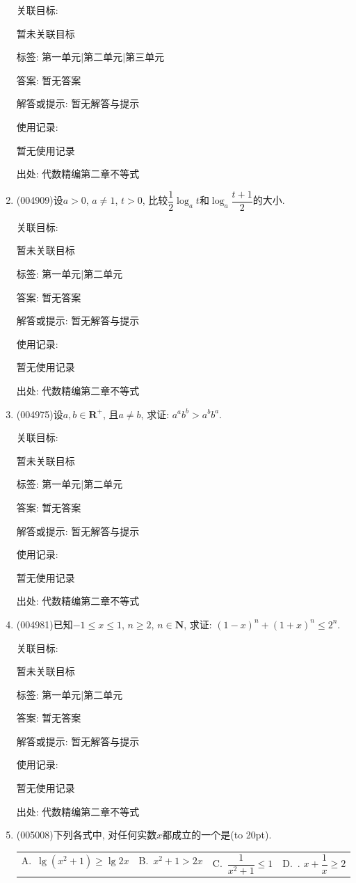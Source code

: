 \documentclass[10pt,a4paper]{article}
\newcommand{\bracket}[1]{(\hbox to #1pt{})}
\newcommand{\fourch}[4]{\par\begin{tabular}{p{.23\textwidth}p{.23\textwidth}p{.23\textwidth}p{.23\textwidth}}
A.~#1 &B.~#2& C.~#3& D.~#4
\end{tabular}}
\begin{document}
\begin{enumerate}[1.]
关联目标:

暂未关联目标



标签: 第一单元|第二单元|第三单元

答案: 暂无答案

解答或提示: 暂无解答与提示

使用记录:

暂无使用记录


出处: 代数精编第二章不等式
\item { (004909)}设$a>0$, $a\ne 1$, $t>0$, 比较$\dfrac 12\log_at$和$\log_a\dfrac{t+1}2$的大小.


关联目标:

暂未关联目标



标签: 第一单元|第二单元

答案: 暂无答案

解答或提示: 暂无解答与提示

使用记录:

暂无使用记录


出处: 代数精编第二章不等式
\item { (004975)}设$a,b\in \mathbf{R}^+$, 且$a\ne b$, 求证: $a^ab^b>a^bb^a$.


关联目标:

暂未关联目标



标签: 第一单元|第二单元

答案: 暂无答案

解答或提示: 暂无解答与提示

使用记录:

暂无使用记录


出处: 代数精编第二章不等式
\item { (004981)}已知$-1\le x\le 1$, $n\ge 2$, $n\in \mathbf{N}$, 求证: $(1-x)^n+(1+x)^n\le 2^n$.


关联目标:

暂未关联目标



标签: 第一单元|第二单元

答案: 暂无答案

解答或提示: 暂无解答与提示

使用记录:

暂无使用记录


出处: 代数精编第二章不等式
\item { (005008)}下列各式中, 对任何实数$x$都成立的一个是\bracket{20}.
\fourch{$\lg (x^2+1)\ge \lg 2x$}{$x^2+1>2x$}{$\dfrac 1{x^2+1}\le 1$}{. $x+\dfrac 1x\ge 2$}



\end{enumerate}
\end{document}
